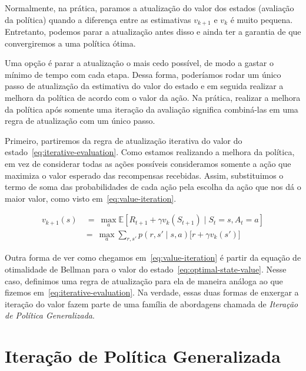 \documentclass{article}
\begin{document}
        Normalmente, na prática, paramos a atualização do valor dos estados (avaliação da política) quando a diferença entre as estimativas $v_{k+1}$ e $v_k$ é muito pequena. Entretanto, podemos parar a atualização antes disso e ainda ter a garantia de que convergiremos a uma política ótima.

        Uma opção é parar a atualização o mais cedo possível, de modo a gastar o mínimo de tempo com cada etapa. Dessa forma, poderíamos rodar um único passo de atualização da estimativa do valor do estado e em seguida realizar a melhora da política de acordo com o valor da ação. Na prática, realizar a melhora da política após somente uma iteração da avaliação significa combiná-las em uma regra de atualização com um único passo.

        Primeiro, partiremos da regra de atualização iterativa do valor do estado~\eqref{eq:iterative-evaluation}. Como estamos realizando a melhora da política, em vez de considerar todas as ações possíveis consideramos somente a ação que maximiza o valor esperado das recompensas recebidas. Assim, substituimos o termo de soma das probabilidades de cada ação pela escolha da ação que nos dá o maior valor, como visto em~\eqref{eq:value-iteration}.
        
        \begin{equation}
            \begin{aligned}
                v_{k+1}(s) & \ = \ \max_a \mathbb{E}[R_{t+1} + \gamma v_k(S_{t+1}) \mid S_t = s, A_t = a] \\
                & = \ \max_a \sum_{r, s'} p(r, s' \mid s, a) \Big[ r + \gamma v_k(s') \Big]
            \end{aligned}
            \label{eq:value-iteration}
        \end{equation}
        
        Outra forma de ver como chegamos em~\eqref{eq:value-iteration} é partir da equação de otimalidade de Bellman para o valor do estado~\eqref{eq:optimal-state-value}. Nesse caso, definimos uma regra de atualização para ela de maneira análoga ao que fizemos em~\eqref{eq:iterative-evaluation}. Na verdade, essas duas formas de enxergar a iteração do valor fazem parte de uma família de abordagens chamada de \emph{Iteração de Política Generalizada}.
    
    \section{Iteração de Política Generalizada}
    
\end{document}

